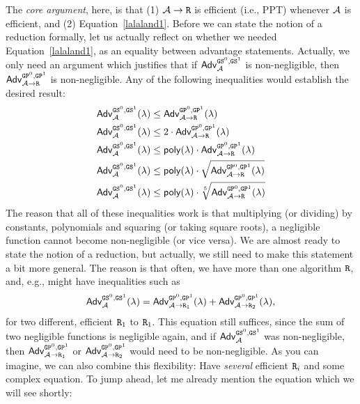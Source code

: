 \documentclass[a4paper,table,dvipsnames]{article}
\theoremstyle{definition}
\newcommand{\M}[1]{\ensuremath{\text{\texttt{#1}}}}
\renewcommand{\O}[1]{\ensuremath{\mathsf{#1}}}
\begin{document}
The \emph{core argument}, here, is that (1) $\adv\rightarrow\M{R}$ is efficient (i.e., PPT) whenever $\mathcal{A}$ is efficient, and (2) Equation~\ref{lalaland1}. Before we can state the notion of a reduction formally, let us actually reflect on whether we needed Equation~\ref{lalaland1}, as an equality between advantage statements. Actually, we only need an argument which justifies that if $\mathsf{Adv}^{\M{GS}^0,\M{GS}^1}_\adv$ is non-negligible, then $\mathsf{Adv}^{\M{GP}^0,\M{GP}^1}_{\adv\rightarrow\M{R}}$ is non-negligible. Any of the following inequalities would establish the desired result:
\begin{align*}
\mathsf{Adv}^{\M{GS}^0,\M{GS}^1}_\adv(\lambda)&\leq\mathsf{Adv}^{\M{GP}^0,\M{GP}^1}_{\adv\rightarrow\M{R}}(\lambda)\\
\mathsf{Adv}^{\M{GS}^0,\M{GS}^1}_\adv(\lambda)&\leq 2\cdot\mathsf{Adv}^{\M{GP}^0,\M{GP}^1}_{\adv\rightarrow\M{R}}(\lambda)\\
\mathsf{Adv}^{\M{GS}^0,\M{GS}^1}_\adv(\lambda)&\leq \O{poly}(\lambda)\cdot\mathsf{Adv}^{\M{GP}^0,\M{GP}^1}_{\adv\rightarrow\M{R}}(\lambda)\\
\mathsf{Adv}^{\M{GS}^0,\M{GS}^1}_\adv(\lambda)&\leq \O{poly}(\lambda)\cdot\sqrt{\mathsf{Adv}^{\M{GP}^0,\M{GP}^1}_{\adv\rightarrow\M{R}}(\lambda)}\\
\mathsf{Adv}^{\M{GS}^0,\M{GS}^1}_\adv(\lambda)&\leq \O{poly}(\lambda)\cdot\sqrt[5]{\mathsf{Adv}^{\M{GP}^0,\M{GP}^1}_{\adv\rightarrow\M{R}}(\lambda)}
\end{align*}
The reason that all of these inequalities work is that multiplying (or dividing) by constants, polynomials and squaring (or taking square roots), a negligible function cannot become non-negligible (or vice versa). We are almost ready to state the notion of a reduction, but actually, we still need to make this statement a bit more general. The reason is that often, we have more than one algorithm $\M{R}$, and, e.g., might have inequalities such as 
\begin{equation}\label{lalaland12}
\mathsf{Adv}^{\M{GS}^0,\M{GS}^1}_\adv(\lambda)=\mathsf{Adv}^{\M{GP}^0,\M{GP}^1}_{\adv\rightarrow\M{R}_1}(\lambda)+\mathsf{Adv}^{\M{GP}^0,\M{GP}^1}_{\adv\rightarrow\M{R}_2}(\lambda),
\end{equation}
for two different, efficient $\M{R}_1$ to $\M{R}_1$. This equation still suffices, since the sum of two negligible functions is negligible again, and if $\mathsf{Adv}^{\M{GS}^0,\M{GS}^1}_\adv$ was non-negligible, then $\mathsf{Adv}^{\M{GP}^0,\M{GP}^1}_{\adv\rightarrow\M{R}_1}$ or 
$\mathsf{Adv}^{\M{GP}^0,\M{GP}^1}_{\adv\rightarrow\M{R}_2}$ would need to be non-negligible. As you can imagine, we can also combine this flexibility: Have \emph{several} efficient $\M{R}_i$ and some complex equation. To jump ahead, let me already mention the equation which we will see shortly:
\end{document}
